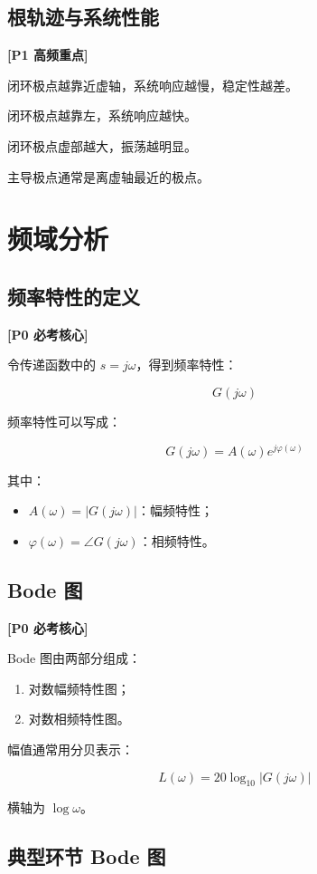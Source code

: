 \documentclass[UTF8,a4paper,12pt]{ctexart}
\newcommand{\Pzero}{\textcolor{p0}{\textbf{[P0 必考核心]}}}
\newcommand{\Pone}{\textcolor{p1}{\textbf{[P1 高频重点]}}}
\begin{document}
\subsection{根轨迹与系统性能}

\Pone

闭环极点越靠近虚轴，系统响应越慢，稳定性越差。

闭环极点越靠左，系统响应越快。

闭环极点虚部越大，振荡越明显。

主导极点通常是离虚轴最近的极点。

\section{频域分析}

\subsection{频率特性的定义}

\Pzero

令传递函数中的 $s=j\omega$，得到频率特性：

\[
G(j\omega)
\]

频率特性可以写成：

\[
G(j\omega)=A(\omega)e^{j\varphi(\omega)}
\]

其中：

\begin{itemize}
    \item $A(\omega)=|G(j\omega)|$：幅频特性；
    \item $\varphi(\omega)=\angle G(j\omega)$：相频特性。
\end{itemize}

\subsection{Bode 图}

\Pzero

Bode 图由两部分组成：

\begin{enumerate}
    \item 对数幅频特性图；
    \item 对数相频特性图。
\end{enumerate}

幅值通常用分贝表示：

\[
L(\omega)=20\log_{10}|G(j\omega)|
\]

横轴为 $\log \omega$。

\subsection{典型环节 Bode 图}
\end{document}
